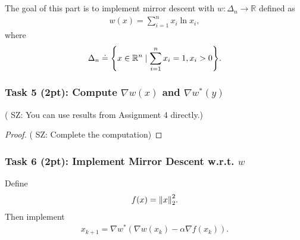 \documentclass[11pt]{article}
\newcommand{\sz}[1]{({\color{blue} {SZ: #1}})}
\newcommand{\R}{\mathbb{R}}
\begin{document}
\part{}

The goal of this part is to implement mirror descent with $w: \Delta_n \to \R$ defined as
\begin{align}
  w(x) = \sum_{i=1}^n x_i \ln x_i,
\end{align}
where 
\begin{align}
  \Delta_n \doteq \qty{ x \in \R^n \mid \sum_{i=1}^n x_i = 1, x_i > 0}.
\end{align}

\section*{Task 5 (2pt): Compute $\nabla w(x)$ and $\nabla w^*(y)$}
\sz{You can use results from Assignment 4 directly.}
\begin{proof}
  \sz{Complete the computation}
\end{proof}


\section*{Task 6 (2pt): Implement Mirror Descent w.r.t. $w$}
Define 
\begin{align}
  f(x) = \norm{x}^2_2.
\end{align}
Then implement
\begin{align}
  x_{k+1} = \nabla w^*\left(\nabla w(x_k) - \alpha \nabla f(x_k)\right).
\end{align}
\end{document}
